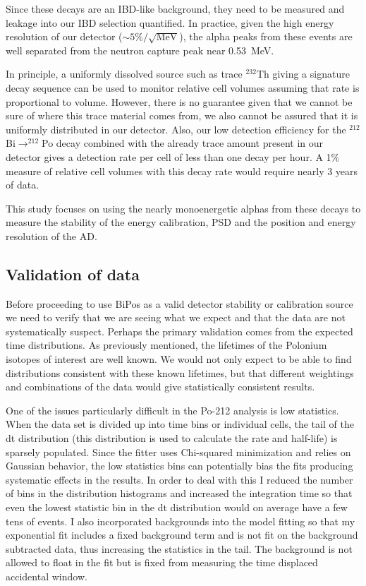 Since these decays are an IBD-like background, they need to be measured and leakage into our IBD selection quantified. In practice, given the high energy resolution of our detector ($\sim5\%/\sqrt{\textrm{MeV}}$), the alpha peaks from these events are well separated from the neutron capture peak near 0.53~MeV.

In principle, a uniformly dissolved source such as trace $^{232}$Th giving a signature decay sequence can be used to monitor relative cell volumes assuming that rate is proportional to volume. However, there is no guarantee given that we cannot be sure of where this trace material comes from, we also cannot be assured that it is uniformly distributed in our detector. Also, our low detection efficiency for the $^{212}$Bi$\rightarrow^{212}$Po decay combined with the already trace amount present in our detector gives a detection rate per cell of less than one decay per hour. A 1\% measure of relative cell volumes with this decay rate would require nearly 3 years of data.

This study focuses on using the nearly monoenergetic alphas from these decays to measure the stability of the energy calibration, PSD and the position and energy resolution of the AD. 

\subsection{Validation of data}
Before proceeding to use BiPos as a valid detector stability or calibration source we need to verify that we are seeing what we expect and that the data are not systematically suspect. Perhaps the primary validation comes from the expected time distributions. As previously mentioned, the lifetimes of the Polonium isotopes of interest are well known. We would not only expect to be able to find distributions consistent with these known lifetimes, but that different weightings and combinations of the data would give statistically consistent results. 

One of the issues particularly difficult in the Po-212 analysis is low statistics. When the data set is divided up into time bins or individual cells, the tail of the dt distribution (this distribution is used to calculate the rate and half-life) is sparsely populated. Since the fitter uses Chi-squared minimization and relies on Gaussian behavior, the low statistics bins can potentially bias the fits producing systematic effects in the results. In order to deal with this I reduced the number of bins in the distribution histograms and increased the integration time so that even the lowest statistic bin in the dt distribution would on average have a few tens of events. I also incorporated backgrounds into the model fitting so that my exponential fit includes a fixed background term and is not fit on the background subtracted data, thus increasing the statistics in the tail. The background is not allowed to float in the fit but is fixed from measuring the time displaced accidental window. 

